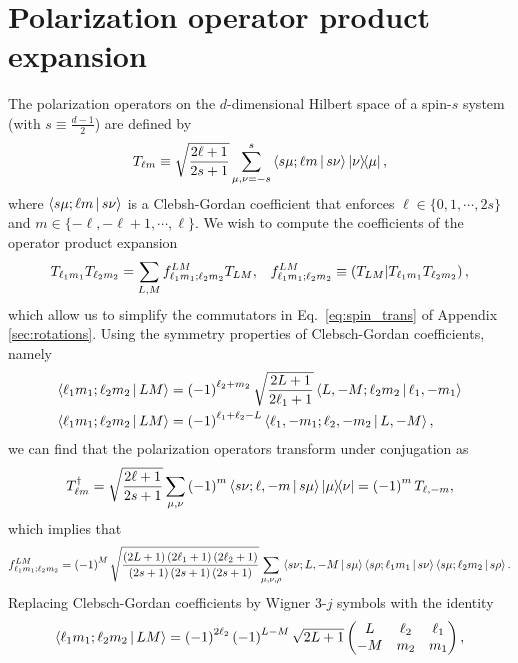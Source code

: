 \documentclass[a4paper,twocolumn,unpublished]{quantumarticle}
\newcommand{\f}[2]{\dfrac{#1}{#2}} %
\newcommand{\p}[1]{\left(#1\right)} %
\newcommand{\bk}{\Braket} %
\renewcommand{\set}[1]{\{#1\}} %
\def\obk#1{\mathinner{({#1})}}
\begin{document}
\section{Polarization operator product expansion}
\label{sec:trans_prod}

The polarization operators on the $d$-dimensional Hilbert space of a spin-$s$ system (with $s\equiv\frac{d-1}{2}$) are defined by
\begin{align}
  T_{\ell m} \equiv \sqrt{\f{2\ell+1}{2s+1}} \sum_{\mu,\nu=-s}^s
  \bk{s\mu;\ell m|s\nu} \op{\nu}{\mu},
\end{align}
where $\bk{s\mu;\ell m|s\nu}$ is a Clebsh-Gordan coefficient that enforces $\ell\in\set{0,1,\cdots,2s}$ and $m\in\set{-\ell,-\ell+1,\cdots,\ell}$.
We wish to compute the coefficients of the operator product expansion
\begin{align}
  T_{\ell_1 m_1} T_{\ell_2 m_2}
  = \sum_{L,M} f_{\ell_1 m_1;\ell_2 m_2}^{LM} T_{LM},
  &&
  f_{\ell_1 m_1;\ell_2 m_2}^{LM}
  \equiv \obk{T_{LM} | T_{\ell_1 m_1} T_{\ell_2 m_2}},
\end{align}
which allow us to simplify the commutators in Eq.~\eqref{eq:spin_trans} of Appendix \ref{sec:rotations}.
Using the symmetry properties of Clebsch-Gordan coefficients, namely
\begin{align}
  \bk{\ell_1 m_1; \ell_2 m_2| L M}
  &= \p{-1}^{\ell_2+m_2} \sqrt{\f{2L+1}{2\ell_1+1}}
  \bk{L,-M; \ell_2 m_2| \ell_1,-m_1} \\
  \bk{\ell_1 m_1; \ell_2 m_2| L M}
  &= \p{-1}^{\ell_1+\ell_2-L}
  \bk{\ell_1,-m_1; \ell_2,-m_2| L,-M},
\end{align}
we can find that the polarization operators transform under conjugation as
\begin{align}
  T_{\ell m}^\dag
  = \sqrt{\f{2\ell+1}{2s+1}}
  \sum_{\mu,\nu} \p{-1}^m \bk{s\nu;\ell,-m|s\mu} \op{\mu}{\nu}
  = \p{-1}^m T_{\ell,-m},
\end{align}
which implies that
\begin{align}
  f_{\ell_1 m_1;\ell_2 m_2}^{LM}
  = \p{-1}^M \sqrt{\f{\p{2L+1}\p{2\ell_1+1}\p{2\ell_2+1}}
    {\p{2s+1}\p{2s+1}\p{2s+1}}}
  \sum_{\mu,\nu,\rho} \bk{s\nu;L,-M|s\mu}
  \bk{s\rho;\ell_1m_1|s\nu} \bk{s\mu;\ell_2m_2|s\rho}.
\end{align}
Replacing Clebsch-Gordan coefficients by Wigner 3-$j$ symbols with the identity
\begin{align}
  \bk{\ell_1 m_1; \ell_2 m_2| L M}
  = \p{-1}^{2\ell_2} \p{-1}^{L-M} \sqrt{2L+1}
  \begin{pmatrix}
    L & \ell_2 & \ell_1 \\
    -M & m_2 & m_1
  \end{pmatrix},
\end{align}
\end{document}
